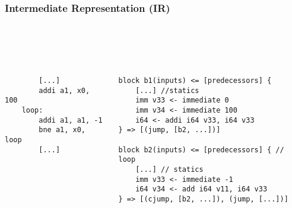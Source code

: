 \begin{frame}[fragile]
    \frametitle{Intermediate Representation (IR)}
    ~\\
    ~\\
    ~\\
    \begin{columns}[c]
        \begin{lstlisting}
        [...]
        addi a1, x0, 100
    loop:
        addi a1, a1, -1
        bne a1, x0, loop
        [...]
        \end{lstlisting}


        \begin{lstlisting}
block b1(inputs) <= [predecessors] {
    [...] //statics
    imm v33 <- immediate 0
    imm v34 <- immediate 100
    i64 <- addi i64 v33, i64 v33
} => [(jump, [b2, ...])]

block b2(inputs) <= [predecessors] { // loop
    [...] // statics
    imm v33 <- immediate -1
    i64 v34 <- add i64 v11, i64 v33
} => [(cjump, [b2, ...]), (jump, [...])]
    \end{lstlisting}
    \end{columns}

\end{frame}
\clearpage



